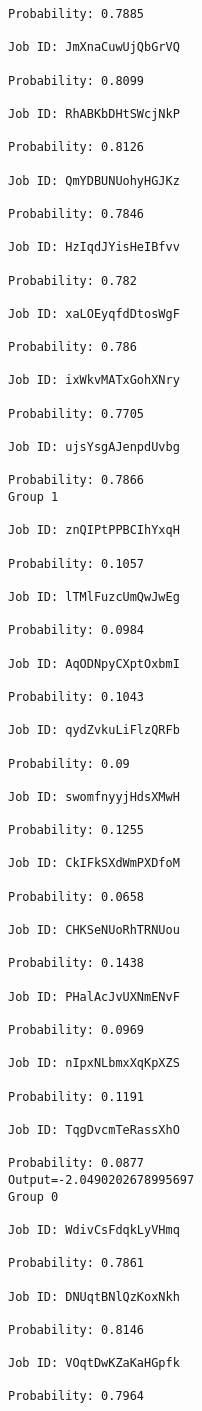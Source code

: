 \documentclass[11pt]{article}
\begin{document}
\begin{Verbatim}[commandchars=\\\{\}]
Probability: 0.7885

Job ID: JmXnaCuwUjQbGrVQ

Probability: 0.8099

Job ID: RhABKbDHtSWcjNkP

Probability: 0.8126

Job ID: QmYDBUNUohyHGJKz

Probability: 0.7846

Job ID: HzIqdJYisHeIBfvv

Probability: 0.782

Job ID: xaLOEyqfdDtosWgF

Probability: 0.786

Job ID: ixWkvMATxGohXNry

Probability: 0.7705

Job ID: ujsYsgAJenpdUvbg

Probability: 0.7866
Group 1

Job ID: znQIPtPPBCIhYxqH

Probability: 0.1057

Job ID: lTMlFuzcUmQwJwEg

Probability: 0.0984

Job ID: AqODNpyCXptOxbmI

Probability: 0.1043

Job ID: qydZvkuLiFlzQRFb

Probability: 0.09

Job ID: swomfnyyjHdsXMwH

Probability: 0.1255

Job ID: CkIFkSXdWmPXDfoM

Probability: 0.0658

Job ID: CHKSeNUoRhTRNUou

Probability: 0.1438

Job ID: PHalAcJvUXNmENvF

Probability: 0.0969

Job ID: nIpxNLbmxXqKpXZS

Probability: 0.1191

Job ID: TqgDvcmTeRassXhO

Probability: 0.0877
Output=-2.0490202678995697
Group 0

Job ID: WdivCsFdqkLyVHmq

Probability: 0.7861

Job ID: DNUqtBNlQzKoxNkh

Probability: 0.8146

Job ID: VOqtDwKZaKaHGpfk

Probability: 0.7964


\end{Verbatim}
\end{document}
